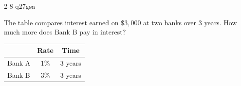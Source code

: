 \begin{practiceQuestion}{2-8-q27}{gsa}
\begin{questionText}
The table compares interest earned on $\$3{,}000$ at two banks over $3$ years. How much more does Bank B pay in interest?

\begin{center}
\begin{tabular}{|l|c|c|}
\hline
 & \textbf{Rate} & \textbf{Time} \\
\hline
Bank A & $1\%$ & $3$ years \\
\hline
Bank B & $3\%$ & $3$ years \\
\hline
\end{tabular}
\end{center}
\end{questionText}
\end{practiceQuestion}

